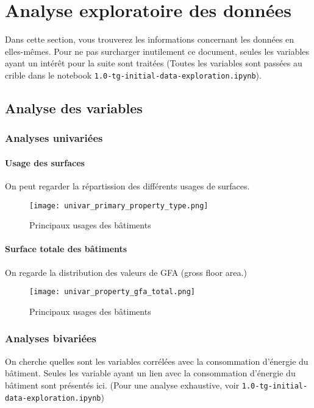 \section{Analyse exploratoire des données}

Dans cette section, vous trouverez les informations concernant les données en
elles-mêmes. Pour ne pas surcharger inutilement ce document, seules les
variables ayant un intérêt pour la suite sont traitées (Toutes les variables
sont passées au crible dans le notebook \Verb+1.0-tg-initial-data-exploration.ipynb+).

\subsection{Analyse des variables}

\subsubsection{Analyses univariées}

\paragraph{Usage des surfaces} On peut regarder la répartission des différents
usages de surfaces.
\begin{figure}[H]
  \texttt{[image: univar\_primary\_property\_type.png]}
  \caption{Principaux usages des bâtiments}
  \label{}
\end{figure}

\paragraph{Surface totale des bâtiments} On regarde la distribution des valeurs
de GFA (gross floor area.)
\begin{figure}[H]
  \texttt{[image: univar\_property\_gfa\_total.png]}
  \caption{Principaux usages des bâtiments}
  \label{}
\end{figure}


\subsubsection{Analyses bivariées}

On cherche quelles sont les variables corrélées avec la consommation d'énergie
du bâtiment. Seules les variable ayant un lien avec la consommation d'énergie du
bâtiment sont présentés ici. (Pour une analyse exhaustive, voir \Verb+1.0-tg-initial-data-exploration.ipynb+)


